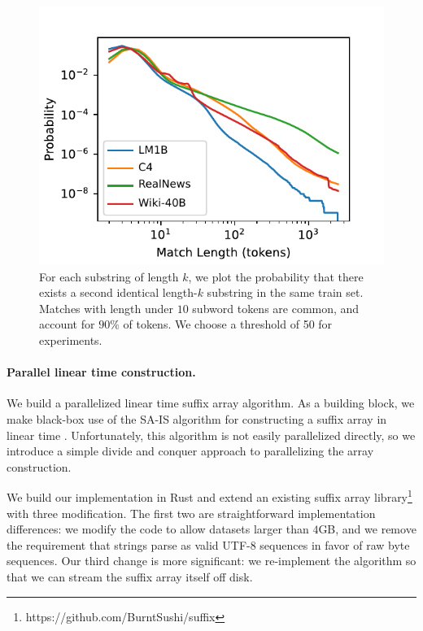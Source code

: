 \begin{figure}
    \centering
    \includegraphics[scale=.8]{figures/match_length.pdf}
    \caption{For each substring of length $k$,
    we plot the probability that there exists a second identical length-$k$ substring in the same train set.
    Matches with length under $10$ subword tokens are common, and account for $90\%$ of tokens.
    We choose a threshold of 50 for experiments.
    }
    \label{fig:suffix-match-len}
\end{figure}


\paragraph{Parallel linear time construction.}
We build a parallelized linear time suffix array algorithm.
%
As a building block, we make black-box use of the SA-IS algorithm for
constructing a suffix array in linear time \citet{nong2009linear,ko2003space}.
%
Unfortunately, this algorithm is not easily parallelized directly, so
we introduce a simple divide and conquer approach to parallelizing the array construction.


We build our implementation in Rust and extend an existing suffix array library\footnote{https://github.com/BurntSushi/suffix}
with three modification.
The first two are straightforward implementation differences:
we modify the code to allow datasets larger than $4$GB,
and we remove the requirement that strings parse as valid UTF-8 sequences in favor of raw byte sequences.
Our third change is more significant: we re-implement the algorithm
so that we can stream the suffix array itself off disk.

